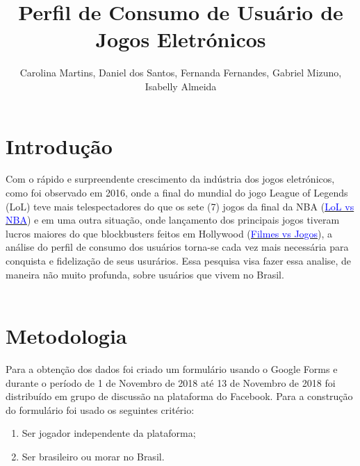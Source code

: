 \documentclass[11pt,a4paper]{article}
\title{Perfil de Consumo de Usuário de Jogos Eletrónicos}
\author{Carolina Martins, Daniel dos Santos, Fernanda Fernandes, Gabriel Mizuno, Isabelly  Almeida}
\date{ }
\begin{document}
 
\maketitle
 
\tableofcontents

\newpage
\section{Introdução}

Com o rápido e surpreendente crescimento da indústria dos jogos eletrónicos, como foi observado em 2016, onde a final do mundial do jogo League of Legends (LoL) teve mais telespectadores do que os sete (7) jogos da final da NBA (\href{https://bit.ly/2Dvdtw9}{\textcolor{blue}{LoL vs NBA}}) e em uma outra situação, onde lançamento dos principais jogos tiveram lucros maiores do que blockbusters feitos em Hollywood  (\href{https://bit.ly/2FfWHTk}{\textcolor{blue}{Filmes vs Jogos}}), a análise do perfil de consumo dos usuários torna-se cada vez mais necessária para conquista e fidelização de seus usurários. Essa pesquisa visa fazer essa analise, de maneira não muito profunda, sobre usuários que vivem no Brasil. 
\\ 
\\
 
\section{Metodologia}

Para a obtenção dos dados foi criado um formulário usando o Google Forms  e durante o período de 1 de Novembro de 2018 até 13 de Novembro de 2018 foi distribuído em grupo de discussão na plataforma do Facebook. Para a construção do formulário foi usado os seguintes critério:

\begin{enumerate}[label=(\roman*)]
\item Ser jogador independente da plataforma;
\item Ser brasileiro ou morar no Brasil.
\end{enumerate}
\end{document}
